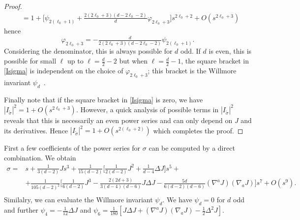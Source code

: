 \documentclass[a4paper,10.9pt]{amsart}
\theoremstyle{definition}
\theoremstyle{remark}
\numberwithin{equation}{section}
\renewcommand{\=}{\stackrel \Sigma =}
\begin{document}
\begin{proof}
\begin{equation}
\begin{split}
& = 1 + \bigl[ \psi_{2(\ell_0+1)} + \tfrac{2(2\ell_0+3)(d-2\ell_0-2)}{d}  \varphi_{2\ell_0+3} \bigr]
s^{2\ell_0+2} + O(s^{2\ell_0+3})
\end{split}
\end{equation}
hence
$$
\varphi_{2\ell_0+3} = - \tfrac{d}{2(2\ell_0+3)(d-2\ell_0-2)} \psi_{2(\ell_0+1)}.
$$
Considering the denominator, this is always possible for $d$ odd. If $d$ is even, this is possible
for small $\ell$ up to $\ell = \tfrac{d}{2}-2$ but when $\ell = \tfrac{d}{2}-1$, the square bracket
in \eqref{Isigma} is independent on the choice of $\varphi_{2\ell_0+3}$; this bracket is the Willmore invariant
$\psi_{d}$~\cite{Will1}.

Finally note that if the square bracket in \eqref{Isigma} is zero, we have 
$|I_{\tilde{\sigma}}|^2 = 1 + O(s^{2\ell_0+3})$. However, a quick analysis of possible terms
in $|I_{\tilde{\sigma}}|^2$ reveals that this is necessarily an even power series and can only depend on $J$ and its derivatives. Hence
$|I_{\tilde{\sigma}}|^2 = 1 + O(s^{2(\ell_0+2)})$ which completes the proof.
\end{proof}

First a few coefficients of the power series for $\sigma$ can be computed by a direct combination. We obtain
\begin{align*}
\sigma =& s + \tfrac{1}{3(d-2)} Js^3 
+ \tfrac{1}{15(d-2)} \bigl[ \tfrac{1}{2(d-2)}J^2 + \tfrac{1}{d-4} \Delta J \bigr] s^5 + \\
& + \tfrac{1}{105(d-2)^2} \bigl[ \tfrac{1}{6(d-2)}J^3 - \tfrac{2(2d+3)}{3(d-4)(d-6)} J \Delta J 
- \tfrac{5d}{6(d-2)(d-6)} (\nabla^a J) (\nabla_a J) \bigr] s^7 + O(s^9).\\
\end{align*}
Similalry, we can evaluate the Willmore invariant $\psi_d$. We have $\psi_d=0$ for $d$ odd and further
$\psi_4 = -\tfrac{1}{12} \Delta J$ and 
$\psi_6 = \tfrac{1}{180} [J \Delta J + (\nabla^a J)(\nabla_a J) - \tfrac12 \Delta^2J]$.
\end{document}
